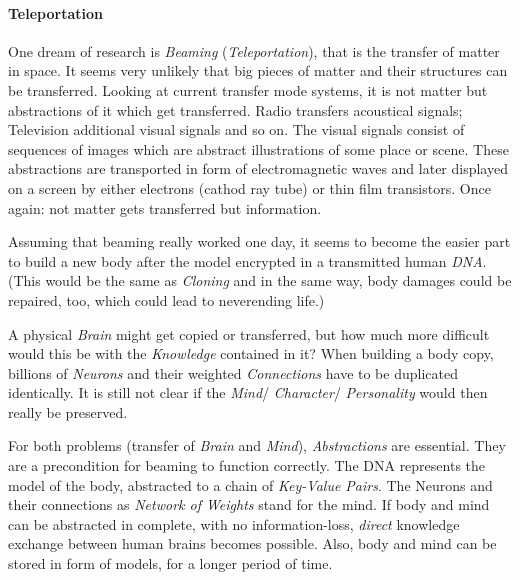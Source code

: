 %
%
%
%
%
%
%

\paragraph{Teleportation}
\label{teleportation_heading}

One dream of research is \emph{Beaming} (\emph{Teleportation}),
that is the transfer of matter in space.
It seems very unlikely that big pieces of matter and their structures can be
transferred. Looking at current transfer mode systems, it is not matter but
abstractions of it which get transferred. Radio transfers acoustical signals;
Television additional visual signals and so on. The visual signals consist of
sequences of images which are abstract illustrations of some place or scene.
These abstractions are transported in form of electromagnetic waves and later
displayed on a screen by either electrons (cathod ray tube) or thin film
transistors. Once again: not matter gets transferred but information.

Assuming that beaming really worked one day, it seems to become the easier part
to build a new body after the model encrypted in a transmitted human \emph{DNA}.
(This would be the same as \emph{Cloning} and in the same way, body damages
could be repaired, too, which could lead to neverending life.)

A physical \emph{Brain} might get copied or transferred, but how much more difficult
would this be with the \emph{Knowledge} contained in it? When building a body copy,
billions of \emph{Neurons} and their weighted \emph{Connections} have to be
duplicated identically. It is still not clear if the \emph{Mind}/ \emph{Character}/
\emph{Personality} would then really be preserved.

For both problems (transfer of \emph{Brain} and \emph{Mind}), \emph{Abstractions}
are essential. They are a precondition for beaming to function correctly. The DNA
represents the model of the body, abstracted to a chain of \emph{Key-Value Pairs}.
The Neurons and their connections as \emph{Network of Weights} stand for the mind.
If body and mind can be abstracted in complete, with no information-loss,
\emph{direct} knowledge exchange between human brains becomes possible. Also,
body and mind can be stored in form of models, for a longer period of time.
